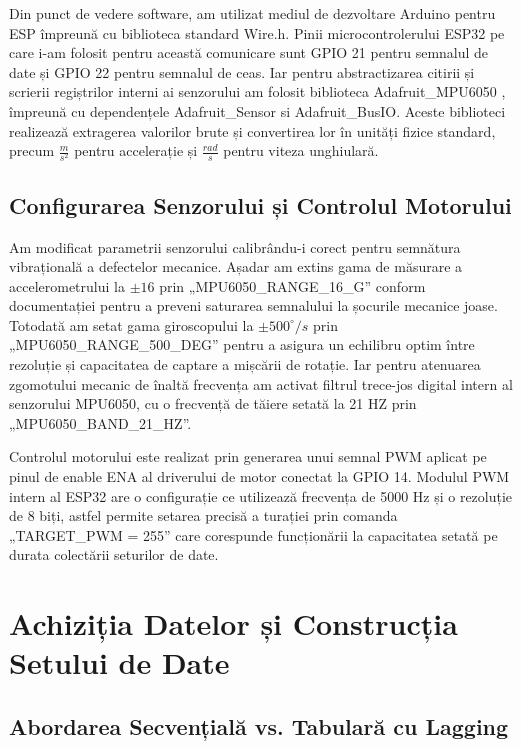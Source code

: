 	Din punct de vedere software, am utilizat mediul de dezvoltare Arduino pentru ESP împreună cu biblioteca standard Wire.h. \cite{arduino:wire} Pinii microcontrolerului ESP32 pe care i-am folosit pentru această comunicare sunt GPIO 21 pentru semnalul de date și GPIO 22 pentru semnalul de ceas. \cite{esp32_datasheet} Iar pentru abstractizarea citirii și scrierii regiștrilor interni ai senzorului am folosit biblioteca Adafruit\_MPU6050 \cite{adafruit:mpu6050}, împreună cu dependențele Adafruit\_Sensor si Adafruit\_BusIO. \cite{adafruit:sensor, adafruit:busio} Aceste biblioteci realizează extragerea valorilor brute și convertirea lor în unități fizice standard, precum $\frac{m}{s^2}$ pentru accelerație și $\frac{rad}{s}$ pentru viteza unghiulară.
	
\subsection{Configurarea Senzorului și Controlul Motorului}
	
	Am modificat parametrii senzorului calibrându-i corect pentru semnătura vibrațională a defectelor mecanice. Așadar am extins gama de măsurare a accelerometrului la $\pm 16$ prin „MPU6050\_RANGE\_16\_G” conform documentației pentru a preveni saturarea semnalului la șocurile mecanice joase. Totodată am setat gama giroscopului la $\pm 500^\circ/s$ prin „MPU6050\_RANGE\_500\_DEG” pentru a asigura un echilibru optim între rezoluție și capacitatea de captare a mișcării de rotație. Iar pentru atenuarea zgomotului mecanic de înaltă frecvența am activat filtrul trece-jos digital intern al senzorului MPU6050, cu o frecvență de tăiere setată la 21 HZ prin „MPU6050\_BAND\_21\_HZ”. \cite{invensense:mpu6050_datasheet}
	
	Controlul motorului este realizat prin generarea unui semnal PWM aplicat pe pinul de enable ENA al driverului de motor conectat la GPIO 14. Modulul PWM intern al ESP32 are o configurație ce utilizează frecvența de 5000 Hz și o rezoluție de 8 biți, astfel permite setarea precisă a turației prin comanda „TARGET\_PWM = 255” care corespunde funcționării la capacitatea setată pe durata colectării seturilor de date. \cite{esp32_datasheet}

\section{Achiziția Datelor și Construcția Setului de Date}
\subsection{Abordarea Secvențială vs. Tabulară cu Lagging} \label{subsec:abordare_secventiala}
	
